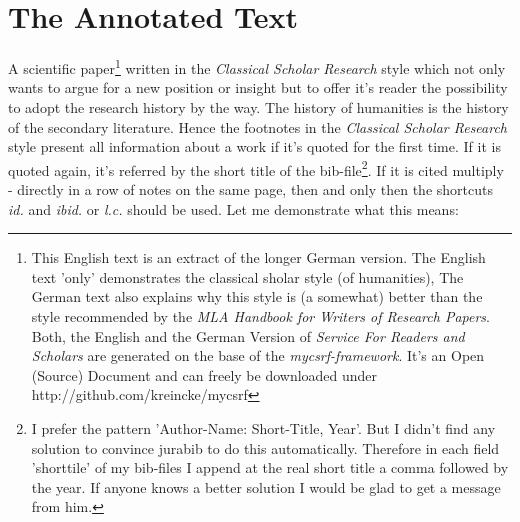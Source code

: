 %
%
%
%

\section{The Annotated Text}

A scientific paper\footnote{This English text is an extract of the longer
German version. The English text 'only' demonstrates the
classical sholar style (of humanities), The German text also explains why
this style is (a somewhat) better than the style recommended by the \textit{MLA
Handbook for Writers of Research Papers}. Both, the English and the German 
Version of \textit{Service For Readers and Scholars} are
generated on the base of the \textit{mycsrf-framework}. It's an Open
(Source) Document and can freely be downloaded under
http://github.com/kreincke/mycsrf} written in the \textit{Classical Scholar 
Research} style which not only wants to argue for a new position or insight
but to offer it's reader the possibility to adopt the research history by the
way. The history of humanities is the history of the secondary literature. Hence
the footnotes in the \textit{Classical Scholar Research} style present all
information about a work if it's quoted for the first time. If it is quoted
again, it's referred by the short title of the bib-file\footnote{I prefer the
pattern 'Author-Name: Short-Title, Year'. But I didn't find any solution to
convince jurabib to do this automatically. Therefore in each field 'shorttile'
of my bib-files I append at the real short title a comma followed by the year. If
anyone knows a better solution I would be glad to get a message from him.}. If
it is cited multiply - directly in a row of notes on the same page, then and
only then the shortcuts \textit{id.} and \textit{ibid.} or \textit{l.c.} should
be used. Let me demonstrate what this means:

